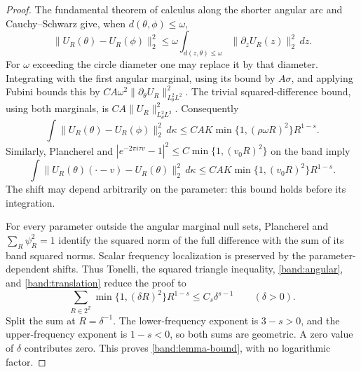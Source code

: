 \begin{proof}
The fundamental theorem of calculus along the shorter angular arc and
Cauchy--Schwarz give, when \(d(\theta,\phi)\leq\omega\),
$$
\|U_R(\theta)-U_R(\phi)\|_2^2
\leq \omega\int_{d(z,\theta)\leq\omega}
                         \|\partial_zU_R(z)\|_2^2\,dz.
$$
For \(\omega\) exceeding the circle diameter one may replace it by that
diameter. Integrating with the first angular marginal, using its bound
by \(A\sigma\), and applying Fubini bounds this by
\(CA\omega^2\|\partial_\theta U_R\|_{L^2_\theta L^2}^2\).
The trivial squared-difference bound, using both marginals, is
\(CA\|U_R\|_{L^2_\theta L^2}^2\). Consequently
\begin{equation}\label{band:angular}
\int\|U_R(\theta)-U_R(\phi)\|_2^2\,d\kappa
\leq CAK\min\{1,(\rho\omega R)^2\}R^{1-s}.
\end{equation}
Similarly, Plancherel and
\(|e^{-2\pi i\tau v}-1|^2\leq C\min\{1,(v_0R)^2\}\)
on the band imply
\begin{equation}\label{band:translation}
\int\|U_R(\theta)(\cdot-v)-U_R(\theta)\|_2^2\,d\kappa
\leq CAK\min\{1,(v_0R)^2\}R^{1-s}.
\end{equation}
The shift may depend arbitrarily on the parameter: this bound holds
before its integration.

For every parameter outside the angular marginal null sets, Plancherel
and \(\sum_R\psi_R^2=1\) identify the squared norm of the full difference
with the sum of its band squared norms. Scalar frequency localization
is preserved by the parameter-dependent shifts. Thus Tonelli, the
squared triangle inequality, \eqref{band:angular}, and
\eqref{band:translation} reduce the proof to
$$
\sum_{R\in2^{\mathbb Z}}\min\{1,(\delta R)^2\}R^{1-s}
\leq C_s\delta^{s-1}\qquad(\delta>0).
$$
Split the sum at \(R=\delta^{-1}\). The lower-frequency exponent is
\(3-s>0\), and the upper-frequency exponent is \(1-s<0\), so both sums
are geometric. A zero value of \(\delta\) contributes zero. This proves
\eqref{band:lemma-bound}, with no logarithmic factor.
\end{proof}

